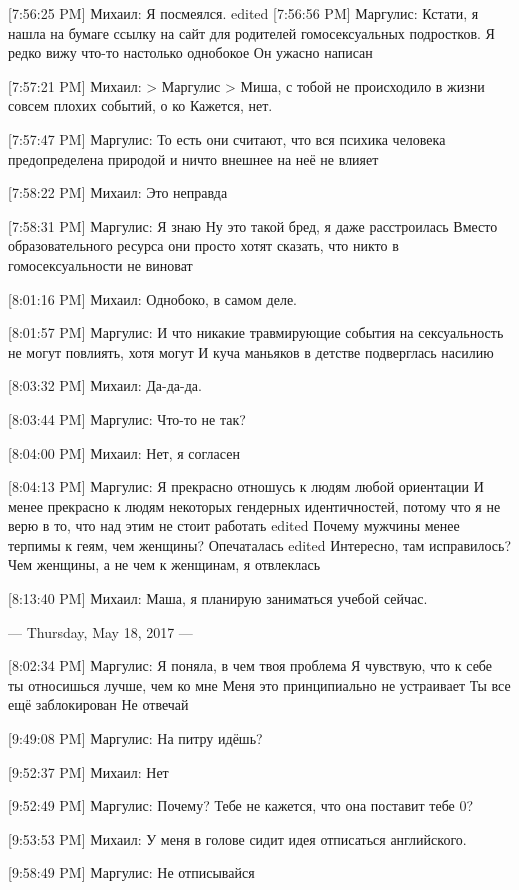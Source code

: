 \documentclass{article}
\begin{document}
{[7:56:25 PM] Михаил:
Я посмеялся.
edited 
[7:56:56 PM] Маргулис:
Кстати, я нашла на бумаге ссылку на сайт для родителей гомосексуальных подростков. Я редко вижу что-то настолько однобокое
 Он ужасно написан

[7:57:21 PM] Михаил:
> Маргулис
> Миша, с тобой не происходило в жизни совсем плохих событий, о ко
Кажется, нет.

[7:57:47 PM] Маргулис:
То есть они считают, что вся психика человека предопределена природой и ничто внешнее на неё не влияет

[7:58:22 PM] Михаил:
Это неправда

[7:58:31 PM] Маргулис:
Я знаю
 Ну это такой бред, я даже расстроилась
 Вместо образовательного ресурса они просто хотят сказать, что никто в гомосексуальности не виноват

[8:01:16 PM] Михаил:
Однобоко, в самом деле.

[8:01:57 PM] Маргулис:
И что никакие травмирующие события на сексуальность не могут повлиять, хотя могут
 И куча маньяков в детстве подверглась насилию

[8:03:32 PM] Михаил:
Да-да-да.

[8:03:44 PM] Маргулис:
Что-то не так?

[8:04:00 PM] Михаил:
Нет, я согласен

[8:04:13 PM] Маргулис:
Я прекрасно отношусь к людям любой ориентации
 И менее прекрасно к людям некоторых гендерных идентичностей, потому что я не верю в то, что над этим не стоит работать
edited 
Почему мужчины менее терпимы к геям, чем женщины?
 Опечаталась
edited 
Интересно, там исправилось?
 Чем женщины, а не чем к женщинам, я отвлеклась

[8:13:40 PM] Михаил:
Маша, я планирую заниматься учебой сейчас.

--- Thursday, May 18, 2017 ---

[8:02:34 PM] Маргулис:
Я поняла, в чем твоя проблема
 Я чувствую, что к себе ты относишься лучше, чем ко мне
 Меня это принципиально не устраивает
 Ты все ещё заблокирован
 Не отвечай

[9:49:08 PM] Маргулис:
На питру идёшь?

[9:52:37 PM] Михаил:
Нет

[9:52:49 PM] Маргулис:
Почему?
 Тебе не кажется, что она поставит тебе 0?

[9:53:53 PM] Михаил:
У меня в голове сидит идея отписаться английского.

[9:58:49 PM] Маргулис:
Не отписывайся

}
\end{document}
